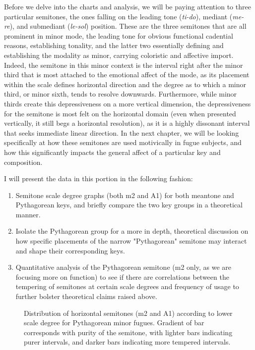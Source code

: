 Before we delve into the charts and analysis, we will be paying
attention to three particular semitones, the ones falling on the leading
tone (\emph{ti-do}), mediant (\emph{me-re}), and submediant
(\emph{le-sol}) position. These are the three semitones that are all
prominent in minor mode, the leading tone for obvious functional
cadential reasons, establishing tonality, and the latter two essentially
defining and establishing the modality as minor, carrying coloristic and
affective import. Indeed, the semitone in this minor context is the
interval right after the minor third that is most attached to the
emotional affect of the mode, as its placement within the scale defines
horizontal direction and the degree as to which a minor third, or minor
sixth, tends to resolve downwards. Furthermore, while minor thirds
create this depressiveness on a more vertical dimension, the
depressiveness for the semitone is most felt on the horizontal domain
(even when presented vertically, it still begs a horizontal resolution),
as it is a highly dissonant interval that seeks immediate linear
direction. In the next chapter, we will be looking specifically at how
these semitones are used motivically in fugue subjects, and how this
significantly impacts the general affect of a particular key and
composition.

I will present the data in this portion in the following fashion:

\begin{enumerate}
\def\labelenumi{\arabic{enumi}.}
\tightlist
\item
  Semitone scale degree graphs (both m2 and A1) for both meantone and
  Pythagorean keys, and briefly compare the two key groups in a
  theoretical manner.
\item
  Isolate the Pythagorean group for a more in depth, theoretical
  discussion on how specific placements of the narrow "Pythagorean"
  semitone may interact and shape their corresponding keys.
\item
  Quantitative analysis of the Pythagorean semitone (m2 only, as we are
  focusing more on function) to see if there are correlations between
  the tempering of semitones at certain scale degrees and frequency of
  usage to further bolster theoretical claims raised above.
\end{enumerate}



\begin{figure}[H]
    \begin{center}
    \caption[Distribution of horizontal semitones, according to lower scale degree for Pythagorean minor fugues. ]{Distribution of horizontal semitones (m2 and A1) according to lower scale degree for Pythagorean minor fugues. Gradient of bar corresponds with purity of the semitone, with lighter bars indicating purer intervals, and darker bars indicating more tempered intervals.}
    \end{center}
\end{figure}
    


